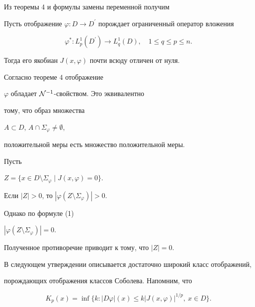 Из теоремы 4 и формулы замены переменной получим





\begin{cor}


Пусть отображение $\varphi :


D\to D^{\prime}$ порождает ограниченный оператор вложения


$$


\varphi^{\ast} : L^1_p(D^{\prime})\to


L^1_q(D),\quad 1\leq q\leq p\leq n.


$$


Тогда его якобиан $J(x,\varphi)$ почти всюду отличен от нуля.


\end{cor}





\begin{pf}


Согласно теореме 4 отображение


$\varphi$ обладает ${\cal N}^{-1}$-свойством. Это эквивалентно


тому, что образ множества


$A\subset D$, $A\cap \Sigma_{\varphi}\ne\emptyset$,


положительной меры есть множество положительной меры.


Пусть


$Z=\{x\in D\setminus \Sigma_{\varphi}\mid J(x,\varphi)=0\}$.


Если $|Z|>0$, то $|\varphi(Z\setminus \Sigma_{\varphi})|>0$.


Однако по формуле (1)


$|\varphi(Z\setminus \Sigma_{\varphi})|=0$.


Полученное противоречие приводит к тому, что $|Z|=0$.


\end{pf}





В следующем утверждении описывается достаточно широкий класс отображений,


порождающих отображения классов Соболева. Напомним, что


$$


K_p(x)=\inf\{k:


|D\varphi|(x)\leq k|J(x,\varphi)|^{1/p},\ x\in D \}.


$$





